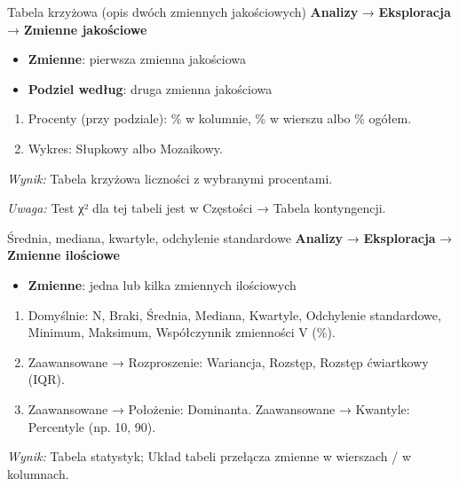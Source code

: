 \documentclass[
  polish,
  10pt,
  a4paper,
  DIV=11,
  numbers=noendperiod]{scrartcl}
\newcommand{\jmenu}[1]{{\color{upwraccent}\small #1}}
\begin{document}
\begin{jbox}{Tabela krzyżowa (opis dwóch zmiennych jakościowych)}\label{w:tabela-krzyzowa-opis}
\jmenu{\textbf{Analizy} → \textbf{Eksploracja} → \textbf{Zmienne jakościowe}}

\begin{itemize}
\item[$\triangleright$] \textbf{Zmienne}: pierwsza zmienna jakościowa
\item[$\triangleright$] \textbf{Podziel według}: druga zmienna jakościowa
\end{itemize}
\begin{enumerate}
\item Procenty (przy podziale): \% w kolumnie, \% w wierszu albo \% ogółem.
\item Wykres: Słupkowy albo Mozaikowy.
\end{enumerate}
\textit{Wynik:} Tabela krzyżowa liczności z wybranymi procentami.

{\color{upwrsoft}\small\textit{Uwaga:} Test χ² dla tej tabeli jest w Częstości → Tabela kontyngencji.}
\end{jbox}

\begin{jbox}{Średnia, mediana, kwartyle, odchylenie standardowe}\label{w:statystyki-opisowe}
\jmenu{\textbf{Analizy} → \textbf{Eksploracja} → \textbf{Zmienne ilościowe}}

\begin{itemize}
\item[$\triangleright$] \textbf{Zmienne}: jedna lub kilka zmiennych ilościowych
\end{itemize}
\begin{enumerate}
\item Domyślnie: N, Braki, Średnia, Mediana, Kwartyle, Odchylenie standardowe, Minimum, Maksimum, Współczynnik zmienności V (\%).
\item Zaawansowane → Rozproszenie: Wariancja, Rozstęp, Rozstęp ćwiartkowy (IQR).
\item Zaawansowane → Położenie: Dominanta. Zaawansowane → Kwantyle: Percentyle (np. 10, 90).
\end{enumerate}
\textit{Wynik:} Tabela statystyk; Układ tabeli przełącza zmienne w wierszach / w kolumnach.

\end{jbox}
\end{document}
